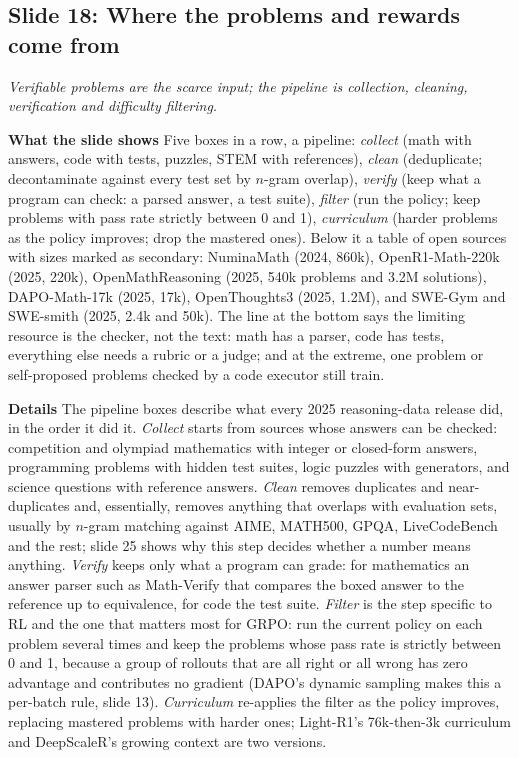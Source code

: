 \documentclass[11pt,letterpaper]{article}
\newcommand{\slide}[3]{%
  \subsection[Slide #1: #2]{Slide #1: #2}%
  {\color{muted}\itshape #3\par}\medskip}
\newcommand{\para}[1]{\medskip\noindent\textbf{#1}\quad}
\begin{document}
\slide{18}{Where the problems and rewards come from}{Verifiable problems are the scarce input; the pipeline is collection, cleaning, verification and difficulty filtering.}

\para{What the slide shows} Five boxes in a row, a pipeline: \emph{collect} (math with answers, code with tests, puzzles, STEM with references), \emph{clean} (deduplicate; decontaminate against every test set by $n$-gram overlap), \emph{verify} (keep what a program can check: a parsed answer, a test suite), \emph{filter} (run the policy; keep problems with pass rate strictly between 0 and 1), \emph{curriculum} (harder problems as the policy improves; drop the mastered ones). Below it a table of open sources with sizes marked as secondary: NuminaMath (2024, 860k), OpenR1-Math-220k (2025, 220k), OpenMathReasoning (2025, 540k problems and 3.2M solutions), DAPO-Math-17k (2025, 17k), OpenThoughts3 (2025, 1.2M), and SWE-Gym and SWE-smith (2025, 2.4k and 50k). The line at the bottom says the limiting resource is the checker, not the text: math has a parser, code has tests, everything else needs a rubric or a judge; and at the extreme, one problem or self-proposed problems checked by a code executor still train.

\para{Details} The pipeline boxes describe what every 2025 reasoning-data release did, in the order it did it. \emph{Collect} starts from sources whose answers can be checked: competition and olympiad mathematics with integer or closed-form answers, programming problems with hidden test suites, logic puzzles with generators, and science questions with reference answers. \emph{Clean} removes duplicates and near-duplicates and, essentially, removes anything that overlaps with evaluation sets, usually by $n$-gram matching against AIME, MATH500, GPQA, LiveCodeBench and the rest; slide 25 shows why this step decides whether a number means anything. \emph{Verify} keeps only what a program can grade: for mathematics an answer parser such as Math-Verify that compares the boxed answer to the reference up to equivalence, for code the test suite. \emph{Filter} is the step specific to RL and the one that matters most for GRPO: run the current policy on each problem several times and keep the problems whose pass rate is strictly between 0 and 1, because a group of rollouts that are all right or all wrong has zero advantage and contributes no gradient (DAPO's dynamic sampling makes this a per-batch rule, slide 13). \emph{Curriculum} re-applies the filter as the policy improves, replacing mastered problems with harder ones; Light-R1's 76k-then-3k curriculum and DeepScaleR's growing context are two versions.
\end{document}
